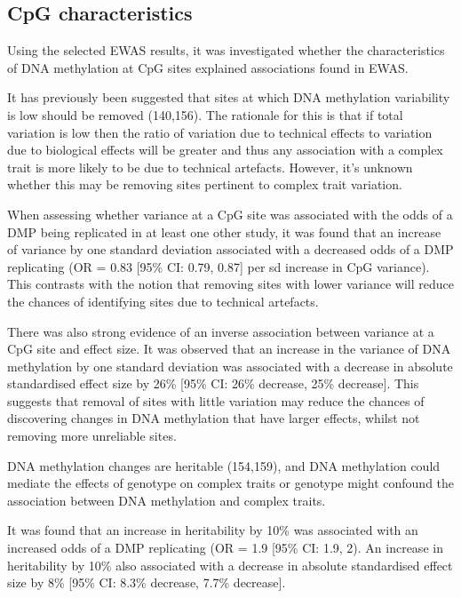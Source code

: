 \documentclass[11pt,oneside]{bristolthesis}
\begin{document}
\hypertarget{cpg-characteristics}{%
\subsection{CpG characteristics}\label{cpg-characteristics}}

Using the selected EWAS results, it was investigated whether the characteristics of DNA methylation at CpG sites explained associations found in EWAS.

It has previously been suggested that sites at which DNA methylation variability is low should be removed (140,156). The rationale for this is that if total variation is low then the ratio of variation due to technical effects to variation due to biological effects will be greater and thus any association with a complex trait is more likely to be due to technical artefacts. However, it's unknown whether this may be removing sites pertinent to complex trait variation.

When assessing whether variance at a CpG site was associated with the odds of a DMP being replicated in at least one other study, it was found that an increase of variance by one standard deviation associated with a decreased odds of a DMP replicating (OR = 0.83 {[}95\% CI: 0.79, 0.87{]} per sd increase in CpG variance). This contrasts with the notion that removing sites with lower variance will reduce the chances of identifying sites due to technical artefacts.

There was also strong evidence of an inverse association between variance at a CpG site and effect size. It was observed that an increase in the variance of DNA methylation by one standard deviation was associated with a decrease in absolute standardised effect size by 26\% {[}95\% CI: 26\% decrease, 25\% decrease{]}. This suggests that removal of sites with little variation may reduce the chances of discovering changes in DNA methylation that have larger effects, whilst not removing more unreliable sites.

DNA methylation changes are heritable (154,159), and DNA methylation could mediate the effects of genotype on complex traits or genotype might confound the association between DNA methylation and complex traits.

It was found that an increase in heritability by 10\% was associated with an increased odds of a DMP replicating (OR = 1.9 {[}95\% CI: 1.9, 2). An increase in heritability by 10\% also associated with a decrease in absolute standardised effect size by 8\% {[}95\% CI: 8.3\% decrease, 7.7\% decrease{]}.
\end{document}
